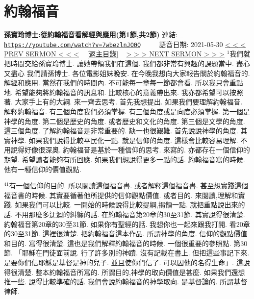 \documentclass{book}
\begin{document}
\section{約翰福音}
\label{sec:7wbezlnJO0Q}
\textbf{孫寶玲博士:從約翰福音看解經與應用(第1節,共2節)}
\newline
\newline
連結: \href{https://youtube.com/watch?v=7wbezlnJO0Q}{\texttt{ https://youtube.com/watch?v=7wbezlnJO0Q}} ~~~~ 語音日期: 2021-05-30 
\newline
\newline
\hyperref[sec:svj043qXB24]{\small{< < < PREV SERMON < < <}}
~
\hyperref[sec:index]{\small{[返主目錄]}}
~
\hyperref[sec:tuRWhEkvI_Q]{\small{> > > NEXT SERMON > > >}}
\newline
\newline
$^{1}$我們就把時間交給孫寶玲博士.
讓她帶領我們在這個.
我們都非常有興趣的課題當中.
盡心又盡心 我們請孫博士.
各位電影姐妹晚安.
在今晚我想向大家報告關於約翰福音的.
解經和應用.
當然在我們的時間內.
不可能每一章每一節都會看.
所以我只會重點地.
希望能夠將約翰福音的訊息和.
比較核心的意義帶出來.
我亦都希望可以按照著.
大家手上有的大綱.
來一齊去思考.
首先我想提出.
如果我們要理解約翰福音.
解釋約翰福音.
有三個角度我們必須掌握.
有三個角度或是向度必須掌握.
第一個是神學的角度.
第二個是歷史的角度.
或者歷史和文化的角度.
第三個是文學的角度.
這三個角度.
了解約翰福音是非常重要的.
缺一也很艱難.
首先說說神學的角度.
其實神學.
如果我們說得比較平民化一點.
就是信仰的角度.
這樣會比較容易理解.
不用說得好像很深奧.
約翰福音是基於一種信仰的思考.
來寫的.
亦都存在一個信仰的期望.
希望讀者能夠有所回應.
如果我們想說得更多一點的話.
約翰福音寫的時候.
他有一種信仰的價值觀點.

$^{41}$有一個信仰的目的.
所以閱讀這個福音書.
或者解釋這個福音書.
甚至想實踐這個福音書的時候.
其實要循著他所提供的信仰觀點價值.
或者目的.
來閱讀,理解和實踐.
如果我們可以比較.
一開始的時候說得比較提綱,揭領一點.
就把重點說出來的話.
不用那麼多迂迴的糾纏的話.
在約翰福音第20章的30至31節.
其實說得很清楚.
約翰福音第20章的30至31節.
如果你有聖經的話.
我想你也一起來跟我打開.
看20章的30至31節.
這裡很清楚.
把約翰福音這本作品.
所謂神學的角度.
信仰的觀點價值和目的.
寫得很清楚.
這也是我們解釋約翰福音的時候.
一個很重要的參照點.
第30節.
「耶穌在門徒面前說.
行了許多別的神蹟.
沒有記載在書上.
但把這些事記下來.
是要你們信耶穌是基督是神的兒子.
並且使你們信了.
可以因他的名得生命」.
這說得很清楚.
整本約翰福音所寫的.
所謂目的,神學的取向價值是甚麼.
如果我們還想推一些.
說得比較準確的話.
我們會說約翰福音的神學取向.
是基督論的.
所謂基督律師.
\end{document}
